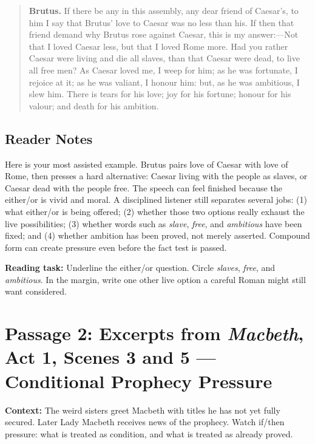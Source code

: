 \documentclass[12pt]{article}
\newenvironment{playpassage}{\begin{quote}\small\setlength{\parskip}{0.12em}\setlength{\parindent}{0pt}}{\end{quote}}
\newcommand{\speaker}[1]{\textbf{#1.}}
\begin{document}
\begin{playpassage}
\speaker{Brutus} If there be any in this assembly, any dear friend of Caesar's, to him I say that Brutus' love to Caesar was no less than his. If then that friend demand why Brutus rose against Caesar, this is my answer:---Not that I loved Caesar less, but that I loved Rome more. Had you rather Caesar were living and die all slaves, than that Caesar were dead, to live all free men? As Caesar loved me, I weep for him; as he was fortunate, I rejoice at it; as he was valiant, I honour him: but, as he was ambitious, I slew him. There is tears for his love; joy for his fortune; honour for his valour; and death for his ambition.
\end{playpassage}

\subsection*{Reader Notes}

Here is your most assisted example. Brutus pairs love of Caesar with love of Rome, then presses a hard alternative: Caesar living with the people as slaves, or Caesar dead with the people free. The speech can feel finished because the either/or is vivid and moral. A disciplined listener still separates several jobs: (1) what either/or is being offered; (2) whether those two options really exhaust the live possibilities; (3) whether words such as \textit{slave}, \textit{free}, and \textit{ambitious} have been fixed; and (4) whether ambition has been proved, not merely asserted. Compound form can create pressure even before the fact test is passed.

\textbf{Reading task:} Underline the either/or question. Circle \textit{slaves}, \textit{free}, and \textit{ambitious}. In the margin, write one other live option a careful Roman might still want considered.

\newpage

\section*{Passage 2: Excerpts from \textit{Macbeth}, Act 1, Scenes 3 and 5 --- Conditional Prophecy Pressure}

\textbf{Context:} The weird sisters greet Macbeth with titles he has not yet fully secured. Later Lady Macbeth receives news of the prophecy. Watch if/then pressure: what is treated as condition, and what is treated as already proved.
\end{document}
